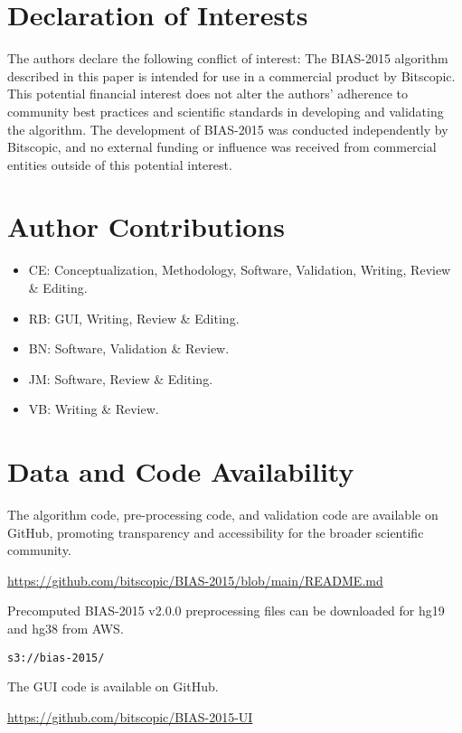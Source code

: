 \documentclass[unnumsec,webpdf,contemporary,large]{oup-authoring-template}
\theoremstyle{thmstyleone}
\theoremstyle{thmstyletwo}
\theoremstyle{thmstylethree}
\begin{document}
\section{Declaration of Interests}
The authors declare the following conflict of interest: The BIAS-2015 algorithm described in this paper is intended for use in a commercial product by Bitscopic. This potential financial interest does not alter the authors’ adherence to community best practices and scientific standards in developing and validating the algorithm. The development of BIAS-2015 was conducted independently by Bitscopic, and no external funding or influence was received from commercial entities outside of this potential interest.

\section{Author Contributions}
\begin{itemize}
    \item CE: Conceptualization, Methodology, Software, Validation, Writing, Review \& Editing.
    \item RB: GUI, Writing, Review \& Editing.
    \item BN: Software, Validation \& Review.
    \item JM: Software, Review \& Editing.
    \item VB: Writing \& Review.
\end{itemize}

\section{Data and Code Availability}

The algorithm code, pre-processing code, and validation code are available on GitHub, promoting transparency and accessibility for the broader scientific community.  
\vspace{5pt}

\noindent\url{https://github.com/bitscopic/BIAS-2015/blob/main/README.md}

\medskip

Precomputed BIAS-2015 v2.0.0 preprocessing files can be downloaded for hg19 and hg38 from AWS.  
\vspace{5pt}

\noindent\texttt{s3://bias-2015/}

\medskip

The GUI code is available on GitHub.  
\vspace{5pt}

\noindent\url{https://github.com/bitscopic/BIAS-2015-UI}
\medskip

\end{document}

